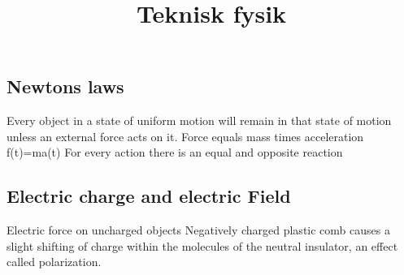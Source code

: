 \title{Teknisk fysik}

\subsection{Newtons laws}
Every object in a state of uniform motion will remain in that state of motion unless an external force acts on it.
Force equals mass times acceleration f(t)=ma(t)
For every action there is an equal and opposite reaction

\subsection{Electric charge and electric Field}
Electric force on uncharged objects \newline
Negatively charged plastic comb causes a slight shifting of charge within the molecules of the neutral insulator, an effect called
polarization. 